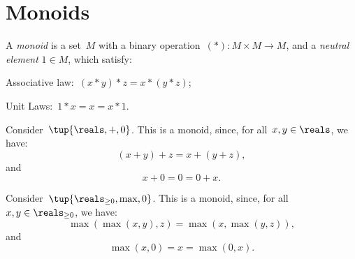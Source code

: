 \section{Monoids}
\begin{definition}[Monoid]
A \emph{monoid} is a set~$M$ with a binary operation~$(*)\colon M\times M\to M$, and a \emph{neutral element} $1\in M$, which satisfy:
\begin{compactenum}
        \item Associative law:~$(x* y)* z=x* (y* z)$;
        \item Unit Laws:~$1* x=x=x* 1$.
\end{compactenum}
\end{definition}
\begin{example}
Consider~$\tup{\reals,+,0}$. This is a monoid, since, for all~$x,y\in \reals$, we have:
\begin{equation*}
    (x+y)+z=x+(y+z),
\end{equation*}
and
\begin{equation*}
    x+0=0=0+x.
\end{equation*}
\end{example}

\begin{example}
Consider~$\tup{\reals_{\geq0},\max,0}$. This is a monoid, since, for all~$x,y\in \reals_{\geq0}$, we have:
\begin{equation*}
    \max(\max(x,y),z)=\max(x,\max(y,z)),
\end{equation*}
and
\begin{equation*}
    \max(x,0)=x=\max(0,x).
\end{equation*}
\end{example}

